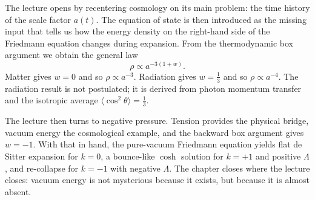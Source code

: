 The lecture opens by recentering cosmology on its main problem: the time history of the scale factor \(a(t)\). The equation of state is then introduced as the missing input that tells us how the energy density on the right-hand side of the Friedmann equation changes during expansion. From the thermodynamic box argument we obtain the general law
\[
\rho\propto a^{-3(1+w)}.
\]
Matter gives \(w=0\) and so \(\rho\propto a^{-3}\). Radiation gives \(w=\tfrac13\) and so \(\rho\propto a^{-4}\). The radiation result is not postulated; it is derived from photon momentum transfer and the isotropic average \(\langle\cos^2\theta\rangle=\tfrac13\).

The lecture then turns to negative pressure. Tension provides the physical bridge, vacuum energy the cosmological example, and the backward box argument gives \(w=-1\). With that in hand, the pure-vacuum Friedmann equation yields flat de Sitter expansion for \(k=0\), a bounce-like \(\cosh\) solution for \(k=+1\) and positive \(\Lambda\), and re-collapse for \(k=-1\) with negative \(\Lambda\). The chapter closes where the lecture closes: vacuum energy is not mysterious because it exists, but because it is almost absent.
